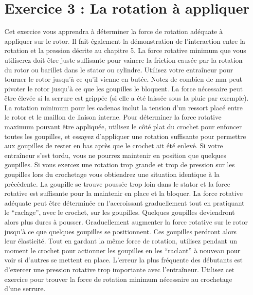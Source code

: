 \documentclass[a4paper,french,11pt,twoside]{report}
\begin{document}
\section{Exercice 3 : La rotation à appliquer}
Cet exercice vous apprendra à déterminer la force de rotation adéquate à appliquer sur le rotor. Il fait également la démonstration de l'interaction entre la rotation et la pression décrite au chapitre 5. La force rotative minimum que vous utiliserez doit être juste suffisante pour vaincre la friction causée par la rotation du rotor ou barillet dans le stator ou cylindre. Utilisez votre entraîneur pour tourner le rotor jusqu'à ce qu'il vienne en butée. Notez de combien de mm peut pivoter le rotor jusqu'à ce que les goupilles le bloquent. La force nécessaire peut être élevée si la serrure est grippée (si elle a été laissée sous la pluie par exemple). La rotation minimum pour les cadenas inclut la tension d'un ressort placé entre le rotor et le maillon de liaison interne.
Pour déterminer la force rotative maximum pouvant être appliquée, utilisez le côté plat du crochet pour enfoncer toutes les goupilles, et essayez d'appliquer une rotation suffisante pour permettre aux goupilles de rester en bas après que le crochet ait été enlevé. Si votre entraîneur s'est tordu, vous ne pourrez maintenir en position que quelques goupilles.
Si vous exercez une rotation trop grande et trop de pression sur les goupilles lors du crochetage vous obtiendrez une situation identique à la précédente. La goupille se trouve poussée trop loin dans le stator et la force rotative est suffisante pour la maintenir en place et la bloquer. La force rotative adéquate peut être déterminée en l'accroissant graduellement tout en pratiquant le \enquote{raclage}, avec le crochet, sur les goupilles. Quelques goupilles deviendront alors plus dures à pousser. Graduellement augmenter la force rotative sur le rotor jusqu'à ce que quelques goupilles se positionnent. Ces goupilles perdront alors leur élasticité. Tout en gardant la même force de rotation, utilisez pendant un moment le crochet pour actionner les goupilles en les \enquote{raclant} à nouveau pour voir si d'autres se mettent en place.
L'erreur la plus fréquente des débutants est d'exercer une pression rotative trop importante avec l'entraîneur. Utilisez cet exercice pour trouver la force de rotation minimum nécessaire au crochetage d'une serrure.
\end{document}
